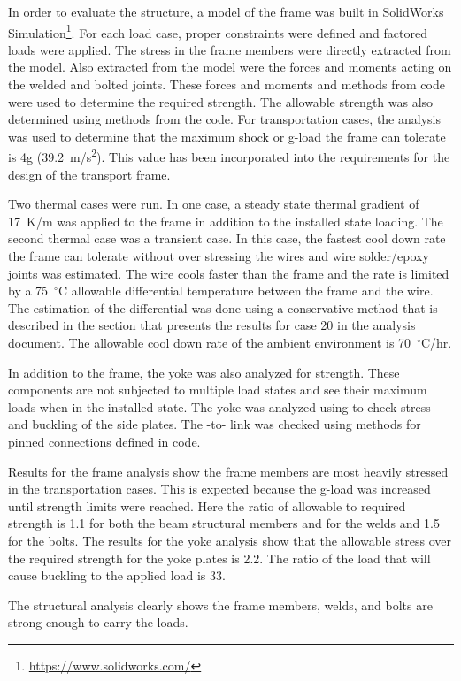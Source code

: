 In order to evaluate the structure, a   model of the   frame was built in SolidWorks Simulation\footnote{\url{https://www.solidworks.com/}}.   For each load case, proper constraints were defined and factored loads were applied.  The stress in the frame members were directly extracted from the model.  Also extracted from the model were the forces and moments acting on the welded and bolted joints. These forces and moments and methods from code were used to determine the required strength.  The allowable strength was also determined using methods from the code.
For transportation cases, the analysis was used to determine that the maximum shock or g-load the   frame can tolerate is 4g (\SI{39.2}{m/s^2}).  This value has been incorporated into the requirements for the design of the transport frame.

Two thermal cases were run. In one case, a steady state thermal gradient of \SI{17}{K/m} was applied to the frame in addition to the installed state loading.   The second thermal case was a transient case.  In this case, the fastest cool down rate the   frame can tolerate without over stressing the wires and wire solder/epoxy joints was estimated.  The wire cools faster than the frame and the \cooldown rate is limited by a 75~$^\circ$C allowable differential temperature between the frame and the wire.  The estimation of the differential was done using a conservative method that is described in the section that presents the results for case 20 in the  analysis document.  The allowable cool down rate of the ambient environment is 70~$^\circ$C/hr.

In addition to the frame, the yoke was also analyzed for strength.  These components are not subjected to multiple load states and see their maximum loads when in the installed state.  The yoke was analyzed using  to check stress and buckling of the side plates.  The  -to-  link was checked using methods for pinned connections defined in code.

Results for the frame analysis show the frame members are most heavily stressed in the transportation cases.  This is expected because the g-load was increased until strength limits were reached.  Here the ratio of allowable to required strength is 1.1 for both the beam structural members and for the welds and 1.5 for the bolts.
The results for the yoke analysis show that the allowable stress over the required strength for the yoke plates is 2.2.  The ratio of the load that will cause buckling to the applied load is 33.

The structural analysis clearly shows the   frame members, welds, and bolts are strong enough to carry the loads.

